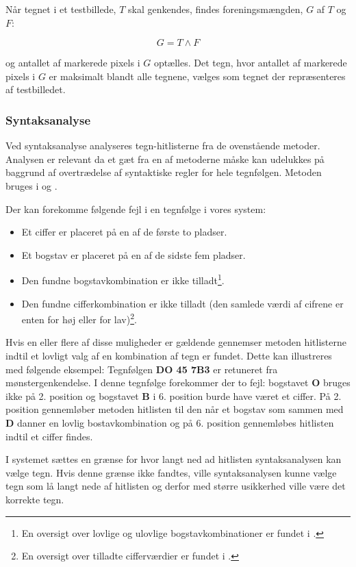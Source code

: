 Når tegnet i et testbillede, $T$ skal genkendes, findes foreningsmængden, $G$ af $T$ og $F$:

\begin{displaymath}
G = T \wedge F
\end{displaymath}

og antallet af markerede pixels i $G$ optælles. Det tegn, hvor antallet af markerede pixels i $G$ er maksimalt blandt alle tegnene, vælges som tegnet der repræsenteres af testbilledet.

\subsubsection*{Syntaksanalyse}

Ved syntaksanalyse analyseres tegn-hitlisterne fra de ovenstående metoder. Analysen er relevant da et gæt fra en af metoderne måske kan udelukkes på baggrund af overtrædelse af syntaktiske regler for hele tegnfølgen. Metoden bruges i \cite{kwas} og \cite{nijhuis}.

Der kan forekomme følgende fejl i en tegnfølge i vores system:

\begin{itemize}
\item Et ciffer er placeret på en af de første to pladser.
\item Et bogstav er placeret på en af de sidste fem pladser.
\item Den fundne bogstavkombination er ikke tilladt\footnote{En oversigt over lovlige og ulovlige bogstavkombinationer er fundet i \cite{bogstav_komb}.}.
\item Den fundne cifferkombination er ikke tilladt (den samlede værdi af cifrene er enten for høj eller for lav)\footnote{En oversigt over tilladte cifferværdier er fundet i \cite{nrpl}.}.
\end{itemize}

Hvis en eller flere af disse muligheder er gældende gennemser metoden hitlisterne indtil et lovligt valg af en kombination af tegn er fundet. Dette kan illustreres med følgende eksempel: Tegnfølgen \textbf{DO 45 7B3} er retuneret fra mønstergenkendelse. I denne tegnfølge forekommer der to fejl: bogstavet \textbf{O} bruges ikke på 2. position og bogstavet \textbf{B} i 6. position burde have været et ciffer. På 2. position gennemløber metoden hitlisten til den når et bogstav som sammen med \textbf{D} danner en lovlig bostavkombination og på 6. position gennemløbes hitlisten indtil et ciffer findes.

I systemet sættes en grænse for hvor langt ned ad hitlisten syntaksanalysen kan vælge tegn. Hvis denne grænse ikke fandtes, ville syntaksanalysen kunne vælge tegn som lå langt nede af hitlisten og derfor med større usikkerhed ville være det korrekte tegn.

